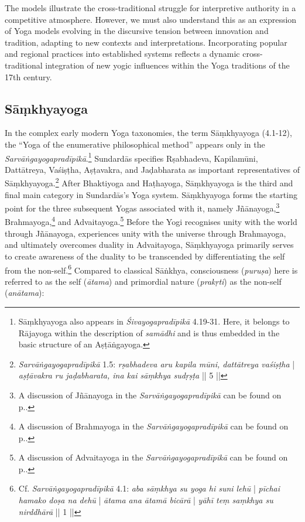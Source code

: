 The models illustrate the cross-traditional struggle for interpretive authority in a competitive atmosphere. However, we must also understand this as an expression of Yoga models evolving in the discursive tension between innovation and tradition, adapting to new contexts and interpretations. Incorporating popular and regional practices into established systems reflects a dynamic cross-traditional integration of new yogic influences within the Yoga traditions of the 17th century.

\subsection{Sāṃkhyayoga}
\label{samkhyayoga}

In the complex early modern Yoga taxonomies, the term Sāṃkhyayoga (4.1-12), the ``Yoga of the enumerative philosophical method'' appears only in the \textit{Sarvāṅgayogapradīpikā}.\footnote{Sāṃkhyayoga also appears in \emph{Śivayogapradīpikā} 4.19-31. Here, it belongs to Rājayoga within the description of \textit{samādhi} and is thus embedded in the basic structure of an Aṣṭāṅgayoga.} Sundardās specifies Rṣabhadeva, Kapilamūni, Dattātreya, Vaśiṣṭha, Aṣṭavakra, and Jaḍabharata as important representatives of Sāṃkhyayoga.\footnote{\emph{Sarvāṅgayogapradīpikā} 1.5: \textit{rṣabhadeva aru kapila mūni, dattātreya vaśiṣṭha} | \textit{aṣṭāvakra ru jaḍabharata, ina kai sāṃkhya sudṛṣṭa} || 5 ||} After Bhaktiyoga and Haṭhayoga, Sāṃkhyayoga is the third and final main category in Sundardās's Yoga system. Sāṃkhyayoga forms the starting point for the three subsequent Yogas associated with it, namely Jñānayoga,\footnote{A discussion of Jñānayoga in the \emph{Sarvāṅgayogapradīpikā} can be found on p.\pageref{jnanayogaintrocandrika}.} Brahmayoga,\footnote{A discussion of Brahmayoga in the \emph{Sarvāṅgayogapradīpikā} can be found on p.\pageref{sundarbrahma}.} and Advaitayoga.\footnote{A discussion of Advaitayoga in the \emph{Sarvāṅgayogapradīpikā} can be found on p.\pageref{sundaradvaita}.} Before the Yogi recognises unity with the world through Jñānayoga, experiences unity with the universe through Brahmayoga, and ultimately overcomes duality in Advaitayoga, Sāṃkhyayoga primarily serves to create awareness of the duality to be transcended by differentiating the self from the non-self.\footnote{Cf. \emph{Sarvāṅgayogapradīpikā} 4.1: \textit{aba sāṃkhya su yoga hi suni lehū} | \textit{pīchai hamako doṣa na dehū} | \textit{ātama ana ātamā bicārā} | \textit{yāhī teṃ saṃkhya su nirddhārā} || 1 ||} Compared to classical Sāṅkhya, consciousness (\textit{puruṣa}) here is referred to as the self (\textit{ātama}) and primordial nature (\textit{prakṛti}) as the non-self (\textit{anātama}):

